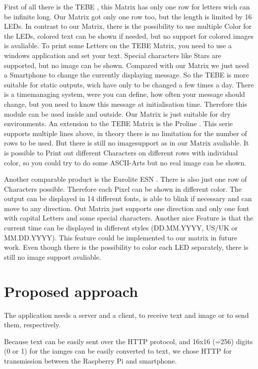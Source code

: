 \documentclass[conference]{IEEEtran}
\begin{document}
First of all there is the TEBE \cite{ledtebe}, this Matrix has only one row for letters wich can be infinite long. Our Matrix got only one row too, but the length is limited by 16 LEDs. In contrast to our Matrix, there is the possibility to use multiple Color for the LEDs, colored text can be shown if needed, but no support for colored images is avaliable. To print some Letters on the TEBE Matrix, you need to use a windows application and set your text. Special characters like Stars are supported, but no image can be shown. Compared with our Matrix we just need a Smartphone to change the currently displaying message. So the TEBE is more suitable for static outputs, wich have only to be changed a few times a day. There is a timemanaging system, were you can define, how often your message should change, but you need to know this message at initialisation time. Therefore this module can be used inside and outside. Our Matrix is just suitable for dry environments. An extension to the TEBE Matrix is the Proline \cite{ledproline}. This serie supports multiple lines above, in theory there is no limitation for the number of rows to be used. But there is still no imagesupport as in our Matrix avaliable. It is possible to Print out different Characters on different rows with individual color, so you could try to do some ASCII-Arts but no real image can be shown.

Another comparable product is the Eurolite ESN \cite{esn}. There is also just one row of Characters possible. Therefore each Pixel can be shown in different color. The output can be displayed in 14 different fonts, is able to blink if necessary and can move to any direction. Out Matrix just supports one direction and only one font with capital Letters and some special characters. Another nice Feature is that the current time can be displayed in different styles (DD.MM.YYYY, US/UK or MM.DD.YYYY). This feature could be implemented to our matrix in future work. Even though there is the possibility to color each LED separately, there is still no image support avaliable.


\section{Proposed approach}
The application needs a server and a client, to receive text and image or to send them, respectively.

Because text can be easily sent over the HTTP protocol, and 16x16 (=256) digits (0 or 1) for the iamges can be easily converted to text, we chose HTTP for transmission between the Raspberry Pi and smartphone.
\end{document}
